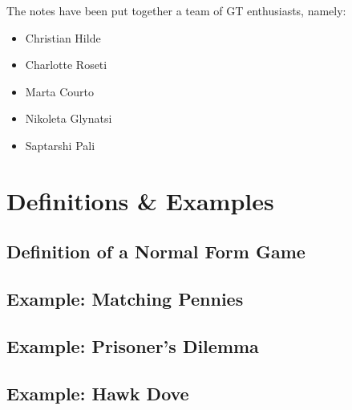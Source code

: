 \documentclass{article}
\begin{document}
The notes have been put together a team of GT enthusiasts, namely:

\begin{itemize}
    \item Christian Hilde
    \item Charlotte Roseti
    \item Marta Courto
    \item Nikoleta Glynatsi
    \item Saptarshi Pali
\end{itemize}

\section{Definitions \& Examples}

\subsection{Definition of a Normal Form Game}





\subsection{Example: Matching Pennies}





\subsection{Example: Prisoner's Dilemma}





\subsection{Example: Hawk Dove}
\end{document}
